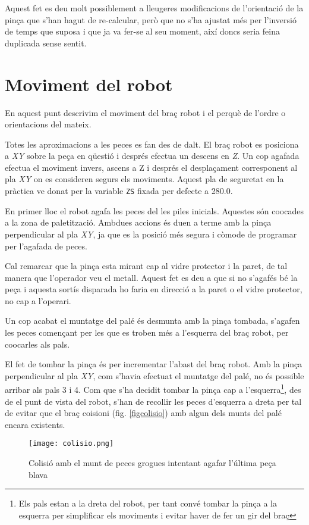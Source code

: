 Aquest fet es deu molt possiblement a lleugeres modificacions de l'orientació de la pinça
que s'han hagut de re-calcular, però que no s'ha ajustat més per l'inversió de temps
que suposa i que ja va fer-se al seu moment, així doncs seria feina duplicada sense sentit.

\section{Moviment del robot}
En aquest punt descrivim el moviment del braç robot i el perquè de l'ordre o
orientacions del mateix.

Totes les aproximacions a les peces es fan des de dalt. El braç robot es
posiciona a \emph{XY} sobre la peça en qüestió i després efectua un descens en \emph{Z}. Un
cop agafada efectua el moviment invers, ascens a Z i després el desplaçament
corresponent al pla \emph{XY} on es consideren segurs els moviments. Aquest pla de
seguretat en la pràctica ve donat per la variable \texttt{ZS} fixada per
defecte a 280.0.

En primer lloc el robot agafa les peces del les piles inicials.
Aquestes són co\lgem ocades a la zona de paletització. Ambdues
accions és duen a terme amb la pinça perpendicular al pla \emph{XY},
ja que es la posició més segura i còmode de programar per l'agafada
de peces.

Cal remarcar que la pinça esta mirant cap al vidre protector i la paret,
de tal manera que l'operador veu el metall. Aquest fet es deu a que
si no s'agafés bé la peça i aquesta sortís disparada ho faria en
direcció a la paret o el vidre protector, no cap a l'operari.

Un cop acabat el muntatge del palé és desmunta amb la pinça tombada,
s'agafen les peces començant per les que es
troben més a l'esquerra del braç robot, per co\lgem ocarles als pals.

El fet de tombar la pinça és per incrementar l'abast del braç robot. Amb la
pinça perpendicular al pla \emph{XY}, com s'havia efectuat el muntatge del palé, no
és possible arribar als pals 3 i 4. Com que s'ha decidit tombar la pinça
cap a l'esquerra\footnote{Els pals estan a la dreta del robot, per tant convé
tombar la pinça a la esquerra per simplificar els moviments i evitar haver
de fer un gir del braç}, des de el punt de vista del robot, s'han de recollir
les peces d'esquerra a dreta per tal de evitar que el braç co\lgem isioni
(fig. \ref{figcolisio}) amb algun dels munts del palé encara existents.

\begin{figure}[H]
\begin{center}
 \texttt{[image: colisio.png]}
\end{center}
  \caption{Colisió amb el munt de peces grogues intentant agafar l'última peça blava}
\end{figure}\label{figcolisio}

